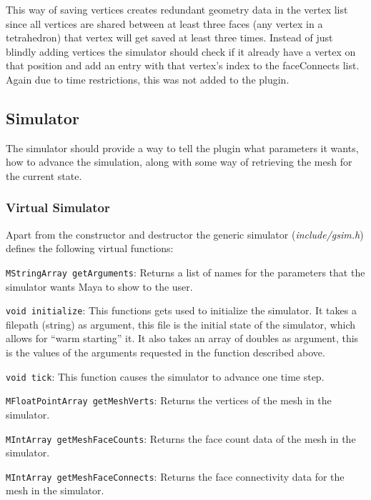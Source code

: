 This way of saving vertices creates redundant geometry data in the vertex list
since all vertices are shared between at least three faces (any vertex in a
tetrahedron) that vertex will get saved at least three times. Instead of just
blindly adding vertices the simulator should check if it already have a vertex
on that position and add an entry with that vertex's index to the faceConnects
list. Again due to time restrictions, this was not added to the plugin.

\subsection{Simulator}
The simulator should provide a way to tell the plugin what parameters it wants,
how to advance the simulation, along with some way of retrieving the mesh for
the current state.

\subsubsection{Virtual Simulator}
Apart from the constructor and destructor the generic simulator
(\textit{include/gsim.h}) defines the following virtual functions:
\begin{itemize*}
  \item \texttt{MStringArray getArguments}: Returns a list of names for the
  parameters that the simulator wants Maya to show to the user.

  \item \texttt{void initialize}: This functions gets used to initialize the
  simulator. It takes a filepath (string) as argument, this file is the initial state of the
  simulator, which allows for ``warm starting'' it. It also takes an array of
  doubles as argument, this is the values of the arguments requested in the
  function described above.

  \item \texttt{void tick}: This function causes the simulator to advance one
  time step.

  \item \texttt{MFloatPointArray getMeshVerts}: Returns the vertices of the
  mesh in the simulator.

  \item \texttt{MIntArray getMeshFaceCounts}: Returns the face count data of
  the mesh in the simulator.

  \item \texttt{MIntArray getMeshFaceConnects}: Returns the face connectivity
  data for the mesh in the simulator.
\end{itemize*}

